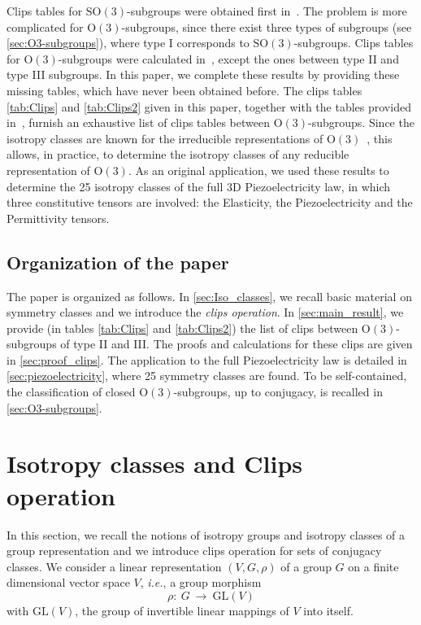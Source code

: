 \documentclass[11pt,a4paper]{amsart}
\theoremstyle{definition}
\newcommand{\OO}{\mathrm{O}}                %
\newcommand{\SO}{\mathrm{SO}}               %
\newcommand{\1}{\mathds{1}}		            %
\begin{document}
Clips tables for $\SO(3)$-subgroups were obtained first in~\cite{Chossat1994}. The problem is more complicated for $\OO(3)$-subgroups, since there exist three types of subgroups (see \autoref{sec:O3-subgroups}), where type I corresponds to $\SO(3)$-subgroups. Clips tables for $\OO(3)$-subgroups were calculated in~\cite{Olive2019}, except the ones between type II and type III subgroups. In this paper, we complete these results by providing these missing tables, which have never been obtained before. The clips tables
\ref{tab:Clips} and \ref{tab:Clips2} given in this paper, together with the tables provided in~\cite{Olive2019}, furnish an exhaustive list of clips tables between $\OO(3)$-subgroups. Since the isotropy classes are known for the irreducible representations of $\OO(3)$~\cite{GSS1988,CLM1990}, this allows, in practice, to determine the isotropy classes of any reducible representation of $\OO(3)$. As an original application, we used these results to determine the 25 isotropy classes of the full 3D Piezoelectricity law, in which three constitutive tensors are involved: the Elasticity, the Piezoelectricity and the Permittivity tensors.

\subsection*{Organization of the paper}

The paper is organized as follows. In \autoref{sec:Iso_classes}, we recall basic material on symmetry classes and we introduce the \emph{clips operation}. In \autoref{sec:main_result}, we provide (in tables \ref{tab:Clips} and \ref{tab:Clips2}) the list of clips between $\OO(3)$-subgroups of type II and III. The proofs and calculations for these clips are given in \autoref{sec:proof_clips}. The application to the full Piezoelectricity law is detailed in \autoref{sec:piezoelectricity}, where 25 symmetry classes are found. To be self-contained, the classification of closed $\OO(3)$-subgroups, up to conjugacy, is recalled in \autoref{sec:O3-subgroups}.

\section{Isotropy classes and Clips operation}
\label{sec:Iso_classes}

In this section, we recall the notions of isotropy groups and isotropy classes of a group representation and we introduce clips operation for sets of conjugacy classes. We consider a linear representation $(V,G,\rho)$ of a group $G$ on a finite dimensional vector space $V$, \textit{i.e.}, a group morphism
\begin{equation*}
  \rho:\ G\ \rightarrow\ \mathrm{GL}(V)
\end{equation*}
with $\mathrm{GL}(V)$, the group of invertible linear mappings of $V$ into itself.
\end{document}
